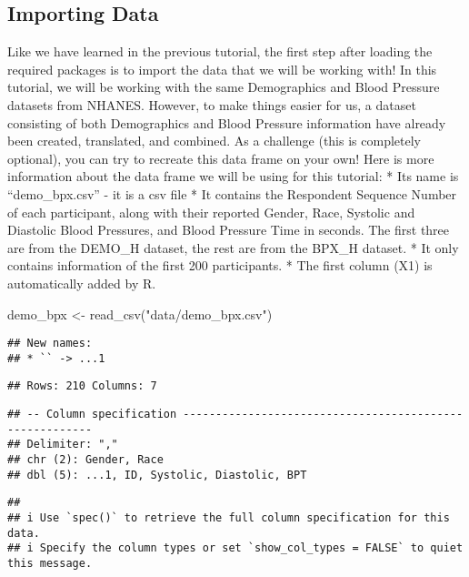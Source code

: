 \documentclass[
]{book}
\newenvironment{Shaded}{\begin{snugshade}}{\end{snugshade}}
\newcommand{\FunctionTok}[1]{\textcolor[rgb]{0.00,0.00,0.00}{#1}}
\newcommand{\NormalTok}[1]{#1}
\newcommand{\OtherTok}[1]{\textcolor[rgb]{0.56,0.35,0.01}{#1}}
\newcommand{\StringTok}[1]{\textcolor[rgb]{0.31,0.60,0.02}{#1}}
\begin{document}
\hypertarget{importing-data}{%
\subsection{Importing Data}\label{importing-data}}

Like we have learned in the previous tutorial, the first step after loading the required packages is to import the data that we will be working with! In this tutorial, we will be working with the same Demographics and Blood Pressure datasets from NHANES. However, to make things easier for us, a dataset consisting of both Demographics and Blood Pressure information have already been created, translated, and combined. As a challenge (this is completely optional), you can try to recreate this data frame on your own! Here is more information about the data frame we will be using for this tutorial:
* Its name is ``demo\_bpx.csv'' - it is a csv file
* It contains the Respondent Sequence Number of each participant, along with their reported Gender, Race, Systolic and Diastolic Blood Pressures, and Blood Pressure Time in seconds. The first three are from the DEMO\_H dataset, the rest are from the BPX\_H dataset.
* It only contains information of the first 200 participants.
* The first column (X1) is automatically added by R.

\begin{Shaded}
\begin{Highlighting}[]
\NormalTok{demo\_bpx }\OtherTok{\textless{}{-}} \FunctionTok{read\_csv}\NormalTok{(}\StringTok{"data/demo\_bpx.csv"}\NormalTok{)}
\end{Highlighting}
\end{Shaded}

\begin{verbatim}
## New names:
## * `` -> ...1
\end{verbatim}

\begin{verbatim}
## Rows: 210 Columns: 7
\end{verbatim}

\begin{verbatim}
## -- Column specification --------------------------------------------------------
## Delimiter: ","
## chr (2): Gender, Race
## dbl (5): ...1, ID, Systolic, Diastolic, BPT
\end{verbatim}

\begin{verbatim}
## 
## i Use `spec()` to retrieve the full column specification for this data.
## i Specify the column types or set `show_col_types = FALSE` to quiet this message.
\end{verbatim}
\end{document}
